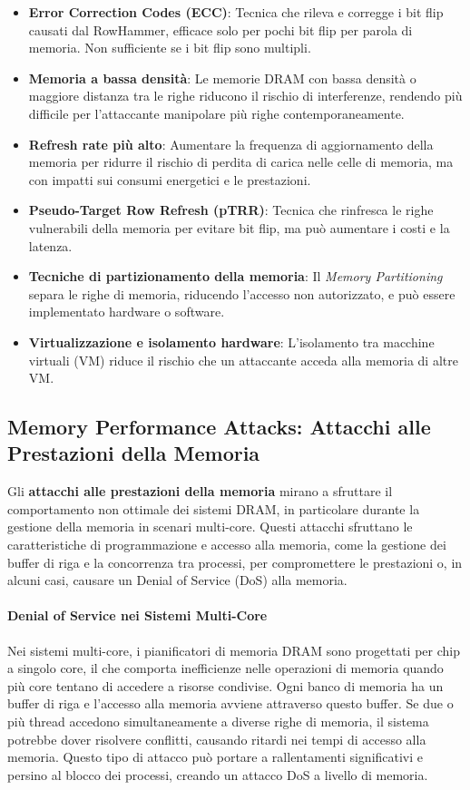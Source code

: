 \begin{itemize}
    \item \textbf{Error Correction Codes (ECC)}: Tecnica che rileva e corregge i bit flip causati dal RowHammer, efficace solo per pochi bit flip per parola di memoria. Non sufficiente se i bit flip sono multipli.
    \item \textbf{Memoria a bassa densità}: Le memorie DRAM con bassa densità o maggiore distanza tra le righe riducono il rischio di interferenze, rendendo più difficile per l'attaccante manipolare più righe contemporaneamente.
    \item \textbf{Refresh rate più alto}: Aumentare la frequenza di aggiornamento della memoria per ridurre il rischio di perdita di carica nelle celle di memoria, ma con impatti sui consumi energetici e le prestazioni.
    \item \textbf{Pseudo-Target Row Refresh (pTRR)}: Tecnica che rinfresca le righe vulnerabili della memoria per evitare bit flip, ma può aumentare i costi e la latenza.
    \item \textbf{Tecniche di partizionamento della memoria}: Il \emph{Memory Partitioning} separa le righe di memoria, riducendo l'accesso non autorizzato, e può essere implementato hardware o software.
    \item \textbf{Virtualizzazione e isolamento hardware}: L'isolamento tra macchine virtuali (VM) riduce il rischio che un attaccante acceda alla memoria di altre VM.
\end{itemize}




\subsection{Memory Performance Attacks: Attacchi alle Prestazioni della Memoria}
Gli \textbf{attacchi alle prestazioni della memoria} mirano a sfruttare il comportamento non ottimale dei sistemi DRAM, in particolare durante la gestione della memoria in scenari multi-core. Questi attacchi sfruttano le caratteristiche di programmazione e accesso alla memoria, come la gestione dei buffer di riga e la concorrenza tra processi, per compromettere le prestazioni o, in alcuni casi, causare un Denial of Service (DoS) alla memoria.

\paragraph{Denial of Service nei Sistemi Multi-Core}
Nei sistemi multi-core, i pianificatori di memoria DRAM sono progettati per chip a singolo core, il che comporta inefficienze nelle operazioni di memoria quando più core tentano di accedere a risorse condivise. Ogni banco di memoria ha un buffer di riga e l'accesso alla memoria avviene attraverso questo buffer. Se due o più thread accedono simultaneamente a diverse righe di memoria, il sistema potrebbe dover risolvere conflitti, causando ritardi nei tempi di accesso alla memoria. Questo tipo di attacco può portare a rallentamenti significativi e persino al blocco dei processi, creando un attacco DoS a livello di memoria.

